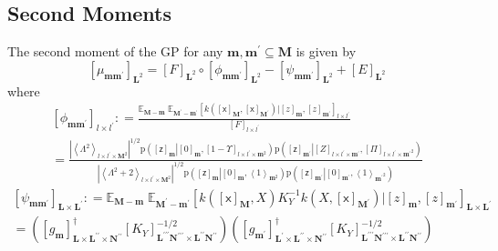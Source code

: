 \documentclass[preprint,12pt]{elsarticle}
\newcommand*{\M}[1]{\ensuremath{#1}\xspace}
\newcommand*{\x}{\times}
\newcommand*{\mi}[1]{\mathbf{#1}}
\newcommand*{\rv}[1]{\mathsf{#1}}
\newcommand*{\te}[2][]{\left\lbrack{#2}\right\rbrack_{#1}}
\newcommand*{\diag}[2][]{\left\langle{#2}\right\rangle_{#1}}
\newcommand*{\prob}[3]{\M{\mathrm{p}\!\left(\left.{#1}\right\vert{#2,#3}\right)}}
\newcommand*{\deq}{\M{\mathrel{\mathop:}=}}
\newcommand*{\evt}[3][]{\mathbb{E}_{#3}^{#1}\!#2}
\newcommand*{\modulus}[1]{\M{\left\lvert{#1}\right\rvert}}
\begin{document}
        \subsection{Second Moments} \label{sub:GPMom:Second}
        The second moment of the GP for any $\mi{m,m^{\prime}}\subseteq\mi{M}$ is given by
            \begin{equation} \label{eq:GPMom:Second}
                \te[\mi{L}^2]{\mu_{\mi{mm^{\prime}}}} = 
                \te[\mi{L}^2]{F} \circ \te[\mi{L}^2]{\phi_{\mi{mm^{\prime}}}} - \te[\mi{L}^2]{\psi_{\mi{mm^{\prime}}}} + \te[\mi{L}^2]{E}                        
            \end{equation}
            where
            \begin{multline*}
                \te[l\x l^{\prime}]{\phi_{\mi{mm^{\prime}}}}
                \deq \frac{\evt{\;\evt{\te[l\x l^{\prime}]{k\!\left(\te[\mi{M}]{\rv{x}},\te[\mi{M^{\prime}}]{\rv{x}}\right) \big\vert \te[\mi{m}]{z},\te[\mi{m^{\prime}}]{z}}}{\mi{M^{\prime}-m^{\prime}}}}{\mi{M-m}}}{\te[l\x l^{\prime}]{F}} \\
                = \frac
                {\modulus{\diag[l\x l^{\prime}\x\mi{M}^{2}]{\Lambda^{2}}}^{1/2} \prob{\te[\mi{m}]{\rv{z}}}{\te[\mi{m}]{0}}{\te[l\x l^{\prime}\x\mi{m}^2]{1-\Upsilon}}\prob{\te[\mi{m^{\prime}}]{\rv{z}}}{\te[l\x l^{\prime}\x \mi{m^{\prime}}]{Z}}{\te[l\x l^{\prime}\x\mi{m^{\prime}}^{2}]{\Pi}}}
                {\modulus{\diag[l\x l^{\prime}\x\mi{M}^2]{\Lambda^{2}+2}}^{1/2}
                \prob{\te[\mi{m}]{\rv{z}}}{\te[\mi{m}]{0}}{\diag[\mi{m}^{2}]{1}}\prob{\te[\mi{m^{\prime}}]{\rv{z}}}{\te[\mi{m^{\prime}}]{0}}{\diag[\mi{m^{\prime}}^{2}]{1}}}
            \end{multline*}
            \begin{multline*}
                \te[\mi{L\x L^{\prime}}]{\psi_{\mi{mm^{\prime}}}}
                \deq \evt{\;\evt{\te[\mi{L\x L^{\prime}}]{k\!\left(\te[\mi{M}]{\rv{x}},X\right) K_{Y}^{-1} k\!\left(X,\te[\mi{M^{\prime}}]{\rv{x}}\right) \big\vert \te[\mi{m}]{z},\te[\mi{m^{\prime}}]{z}}}{\mi{M^{\prime}-m^{\prime}}}}{\mi{M-m}} \\
                 = \left(\te[\mi{L\x L^{\prime\prime}\x N^{\prime\prime}}]{g_{\mi{m}}}^{\dagger}
                    \te[\mi{L^{\prime\prime\prime}N^{\prime\prime\prime}}\x\mi{L^{\prime\prime}N^{\prime\prime}}]{K_{Y}}^{-1/2}\right)
                \left(\te[\mi{L^{\prime}\x L^{\prime\prime}\x N^{\prime\prime}}]{g_{\mi{m^{\prime}}}}^{\dagger}
                    \te[\mi{L^{\prime\prime\prime}N^{\prime\prime\prime}}\x\mi{L^{\prime\prime}N^{\prime\prime}}]{K_{Y}}^{-1/2}\right)
            \end{multline*}
\end{document}
